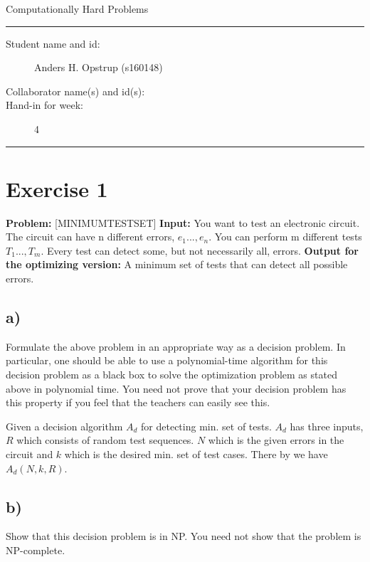 \documentclass[11pt]{article}
\begin{document}
\begin{center}
{{\Large \sc Computationally Hard Problems}}
\end{center}
\rule{\textwidth}{1pt}
\begin{description}
\item[Student name and id:] Anders H. Opstrup (s160148)
\item[Collaborator name(s) and id(s):]
\item[Hand-in for week:] 4
\end{description}
\rule{\textwidth}{1pt}

\section*{Exercise 1}
\textbf{Problem:} [MINIMUMTESTSET] \newline
\textbf{Input:} You want to test an electronic circuit. The circuit can have n different errors, $e_{1} ..., e_{n}$. You can perform m different tests $T{_1}..., T{_m}$. Every test can detect some, but not necessarily all, errors. \newline
\textbf{Output for the optimizing version:} A minimum set of tests that can detect all possible errors.

\subsection*{a)}
Formulate the above problem in an appropriate way as a decision problem. In particular, one should be able to use a polynomial-time algorithm for this decision problem as a black box to solve the optimization problem as stated above in polynomial time. You need not prove that your decision problem has this property if you feel that the teachers can easily see this. \newline

Given a decision algorithm $A_{d}$ for detecting min. set of tests. $A_{d}$ has three inputs, $R$ which consists of random test sequences. $N$ which is the given errors in the circuit and $k$ which is the desired min. set of test cases. There by we have  $A_{d}(N, k, R)$.

\subsection*{b)}
Show that this decision problem is in NP. You need not show that the problem is NP-complete. \newline
\end{document}
